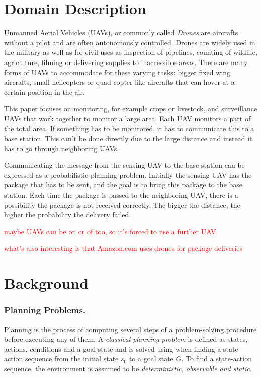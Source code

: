 \documentclass[runningheads,a4paper]{llncs}
\newcommand\myworries[1]{\textcolor{red}{#1}}
\begin{document}

\section{Domain Description}
\label{sec:domaind}

Unmanned Aerial Vehicles (UAVs), or commonly called \emph{Drones} are aircrafts
without a pilot and are often autonomously controlled. Drones are widely used in the
military as well as for civil uses as inspection of pipelines, counting of
wildlife, agriculture, filming or delivering supplies to inaccessible areas.
There are many forms of UAVs to accommodate for these varying tasks: bigger fixed wing
aircrafts, small helicopters or quad copter like aircrafts that can hover at
a certain position in the air.

This paper focuses on monitoring, for example crops or livestock,
and surveillance UAVs that work together to monitor a large area. Each UAV
monitors a part of the total area. If something has to be monitored, it has
to communicate this to a base station. This can't be done directly due to the
large distance and instead it has to go through neighboring UAVs.

Communicating the message from the sensing UAV to the base station can be
expressed as a probabilistic planning problem. Initially the sensing UAV
has the package that has to be sent, and the goal is to bring this package to
the base station. Each time the package is passed to the neighboring UAV,
there is a possibility the package is not received correctly. The bigger the
distance, the higher the probability the delivery failed.

\myworries{maybe UAVs can be on or of too, so it's forced to use a further UAV.}

\myworries{what's also interesting is that Amazon.com uses drones for package deliveries}


\section{Background}
\label{sec:background}

\subsubsection{Planning Problems. } Planning is the process of computing several steps of a problem-solving procedure before executing any of them. A \emph{classical planning problem} is defined as states, actions, conditions and a goal state and is solved using when finding a state-action sequence from the initial state $s_0$ to a goal state $G$. To find a state-action sequence, the environment is assumed to be \emph{deterministic, observable and static}. 
\end{document}
